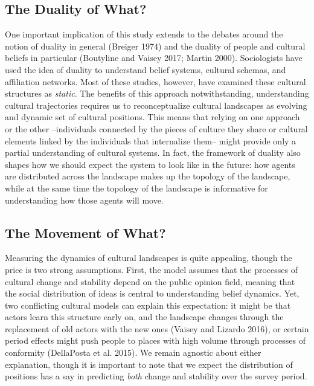 \documentclass[
  11pt,
]{article}
\begin{document}
\hypertarget{the-duality-of-what}{%
\subsection{The Duality of What?}\label{the-duality-of-what}}

One important implication of this study extends to the debates around
the notion of duality in general (Breiger 1974) and the duality of
people and cultural beliefs in particular (Boutyline and Vaisey 2017;
Martin 2000). Sociologists have used the idea of duality to understand
belief systems, cultural schemas, and affiliation networks. Most of
these studies, however, have examined these cultural structures as
\emph{static}. The benefits of this approach notwithstanding,
understanding cultural trajectories requires us to reconceptualize
cultural landscapes as evolving and dynamic set of cultural positions.
This means that relying on one approach or the other --individuals
connected by the pieces of culture they share or cultural elements
linked by the individuals that internalize them-- might provide only a
partial understanding of cultural systems. In fact, the framework of
duality also shapes how we should expect the system to look like in the
future: how agents are distributed across the landscape makes up the
topology of the landscape, while at the same time the topology of the
landscape is informative for understanding how those agents will move.

\hypertarget{the-movement-of-what}{%
\subsection{The Movement of What?}\label{the-movement-of-what}}

Measuring the dynamics of cultural landscapes is quite appealing, though
the price is two strong assumptions. First, the model assumes that the
processes of cultural change and stability depend on the public opinion
field, meaning that the social distribution of ideas is central to
understanding belief dynamics. Yet, two conflicting cultural models can
explain this expectation: it might be that actors learn this structure
early on, and the landscape changes through the replacement of old
actors with the new ones (Vaisey and Lizardo 2016), or certain period
effects might push people to places with high volume through processes
of conformity (DellaPosta et al. 2015). We remain agnostic about either
explanation, though it is important to note that we expect the
distribution of positions has a say in predicting \emph{both} change and
stability over the survey period.
\end{document}
